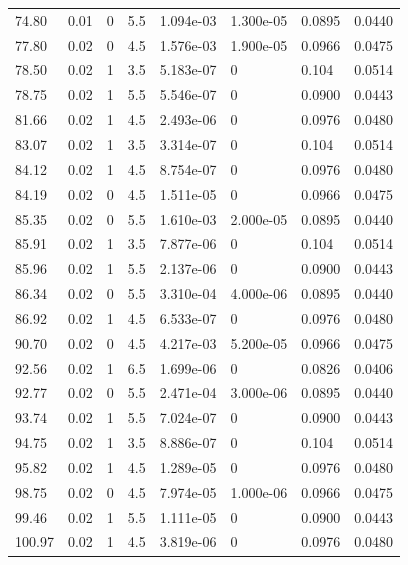 \documentclass[preview]{standalone}
\begin{document}
{{{\begin{tabular}{L{1.2cm}C{1.2cm} C{0.3cm}C{0.5cm} C{1.4cm}C{1.4cm} C{1.4cm}C{1.4cm}}
  74.80  &  0.01  & 0     & 5.5 &  1.094e-03  & 1.300e-05  & 0.0895 &  0.0440   \\ 
  77.80  &  0.02  & 0     & 4.5 &  1.576e-03  & 1.900e-05  & 0.0966 &  0.0475   \\ 
  78.50  &  0.02  & 1     & 3.5 &  5.183e-07  & 0  & 0.104 &  0.0514   \\ 
  78.75  &  0.02  & 1     & 5.5 &  5.546e-07  & 0  & 0.0900 &  0.0443   \\ 
  81.66  &  0.02  & 1     & 4.5 &  2.493e-06  & 0  & 0.0976 &  0.0480   \\ 
  83.07  &  0.02  & 1     & 3.5 &  3.314e-07  & 0  & 0.104 &  0.0514   \\ 
  84.12  &  0.02  & 1     & 4.5 &  8.754e-07  & 0  & 0.0976 &  0.0480   \\ 
  84.19  &  0.02  & 0     & 4.5 &  1.511e-05  & 0  & 0.0966 &  0.0475   \\ 
  85.35  &  0.02  & 0     & 5.5 &  1.610e-03  & 2.000e-05  & 0.0895 &  0.0440   \\ 
  85.91  &  0.02  & 1     & 3.5 &  7.877e-06  & 0  & 0.104 &  0.0514   \\ 
  85.96  &  0.02  & 1     & 5.5 &  2.137e-06  & 0  & 0.0900 &  0.0443   \\ 
  86.34  &  0.02  & 0     & 5.5 &  3.310e-04  & 4.000e-06  & 0.0895 &  0.0440   \\ 
  86.92  &  0.02  & 1     & 4.5 &  6.533e-07  & 0  & 0.0976 &  0.0480   \\ 
  90.70  &  0.02  & 0     & 4.5 &  4.217e-03  & 5.200e-05  & 0.0966 &  0.0475   \\ 
  92.56  &  0.02  & 1     & 6.5 &  1.699e-06  & 0  & 0.0826 &  0.0406   \\ 
  92.77  &  0.02  & 0     & 5.5 &  2.471e-04  & 3.000e-06  & 0.0895 &  0.0440   \\ 
  93.74  &  0.02  & 1     & 5.5 &  7.024e-07  & 0  & 0.0900 &  0.0443   \\ 
  94.75  &  0.02  & 1     & 3.5 &  8.886e-07  & 0  & 0.104 &  0.0514   \\ 
  95.82  &  0.02  & 1     & 4.5 &  1.289e-05  & 0  & 0.0976 &  0.0480   \\ 
  98.75  &  0.02  & 0     & 4.5 &  7.974e-05  & 1.000e-06  & 0.0966 &  0.0475   \\ 
  99.46  &  0.02  & 1     & 5.5 &  1.111e-05  & 0  & 0.0900 &  0.0443   \\ 
  100.97  &  0.02  & 1     & 4.5 &  3.819e-06  & 0  & 0.0976 &  0.0480   \\ 

\end{tabular}}}}
\end{document}
